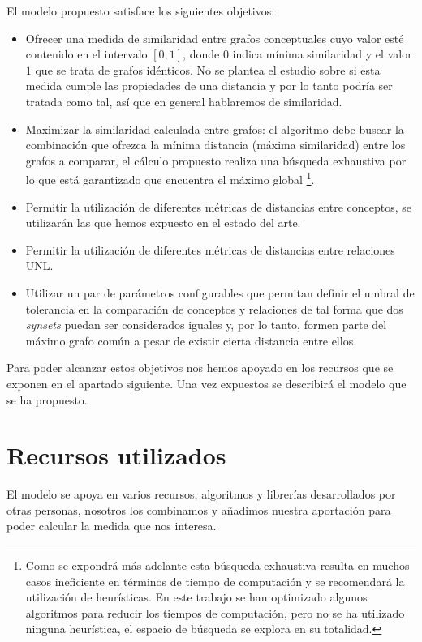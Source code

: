 \documentclass[a4paper,12pt,spanish]{book}
\begin{document}
El modelo propuesto satisface los siguientes objetivos:
\begin{itemize}
\item {} 
Ofrecer una medida de similaridad entre grafos conceptuales cuyo valor esté contenido
en el intervalo \([0,1]\), donde \(0\) indica mínima similaridad
y el valor \(1\) que se trata de grafos idénticos. No se plantea el estudio sobre
si esta medida cumple las propiedades de una distancia y por lo tanto podría ser
tratada como tal, así que en general hablaremos de similaridad.

\item {} 
Maximizar la similaridad calculada entre grafos: el algoritmo debe buscar la combinación que
ofrezca la mínima distancia (máxima similaridad) entre los grafos a comparar, el cálculo
propuesto realiza una búsqueda exhaustiva por lo que está garantizado que
encuentra el máximo global \footnote{
Como se expondrá más adelante esta búsqueda exhaustiva resulta en muchos
casos ineficiente en términos de tiempo de computación y se recomendará la utilización
de heurísticas. En este trabajo se han optimizado algunos algoritmos para reducir
los tiempos de computación, pero no se ha utilizado ninguna heurística, el espacio
de búsqueda se explora en su totalidad.
}.

\item {} 
Permitir la utilización de diferentes métricas de distancias entre conceptos, se
utilizarán las que hemos expuesto en el estado del arte.

\item {} 
Permitir la utilización de diferentes métricas de distancias entre relaciones UNL.

\item {} 
Utilizar un par de parámetros configurables que permitan definir el umbral de
tolerancia en la comparación de conceptos y relaciones de tal forma que dos \emph{synsets}
puedan ser considerados iguales y, por lo tanto, formen parte del máximo grafo
común a pesar de existir cierta distancia entre ellos.

\end{itemize}

Para poder alcanzar estos objetivos nos hemos apoyado en los recursos que se exponen en el
apartado siguiente. Una vez expuestos se describirá el modelo que se ha propuesto.


\section{Recursos utilizados}
\label{4.model/i.recursos:recursos-utilizados}\label{4.model/i.recursos::doc}
El modelo se apoya en varios recursos, algoritmos y librerías desarrollados por
otras personas, nosotros los combinamos y añadimos nuestra aportación para poder
calcular la medida que nos interesa.
\end{document}
